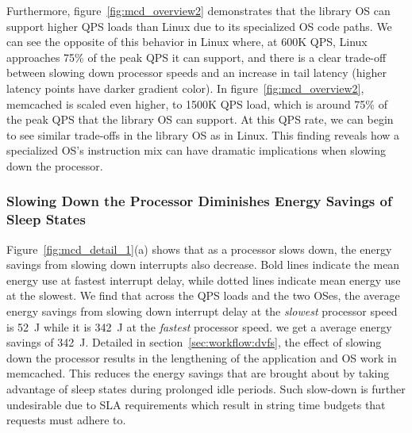 Furthermore, figure~\ref{fig:mcd_overview2} demonstrates that the library OS can support higher QPS loads than Linux due to its specialized OS code paths.
We can see the opposite of this behavior in Linux where, at 600K QPS, Linux approaches 75\% of the peak QPS it can support, and there is a clear trade-off between slowing down processor speeds and an increase in tail latency (higher latency points have darker gradient color).
In figure~\ref{fig:mcd_overview2}, memcached is scaled even higher, to 1500K QPS load, which is around 75\% of the peak QPS that the library OS can support.
At this QPS rate, we can begin to see similar trade-offs in the library OS as in Linux. This finding reveals how a specialized OS's instruction mix can have dramatic implications when slowing down the processor.

\subsubsection{Slowing Down the Processor Diminishes Energy Savings of Sleep States}
\label{sec:mcd:slowprocvssleep}
Figure~\ref{fig:mcd_detail_1}(a) shows that as a processor slows down, the energy savings from slowing down interrupts also decrease.
Bold lines indicate the mean energy use at fastest interrupt delay, while dotted lines indicate mean energy use at the slowest.
We find that across the QPS loads and the two OSes, the average energy savings from slowing down interrupt delay at the \textit{slowest} processor speed is \SI{52}{\joule} while it is \SI{342}{\joule} at the \textit{fastest} processor speed.
 we get a average energy savings of \SI{342}{\joule}.
Detailed in section~\ref{sec:workflow:dvfs}, the effect of slowing down the processor results in the lengthening of the application and OS work in memcached.
This reduces the energy savings that are brought about by taking advantage of sleep states during prolonged idle periods.
Such slow-down is further undesirable due to SLA requirements which result in string time budgets that requests must adhere to.


